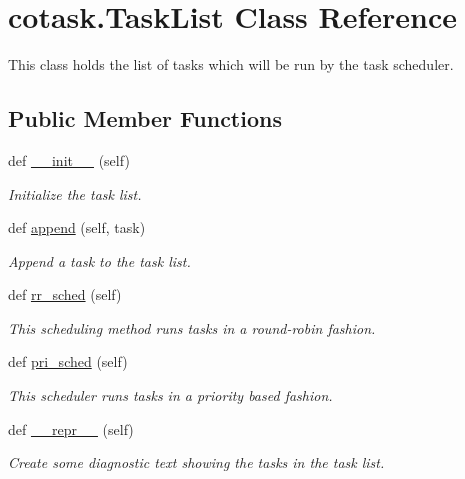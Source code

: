 \hypertarget{classcotask_1_1TaskList}{}\section{cotask.\+Task\+List Class Reference}
\label{classcotask_1_1TaskList}


This class holds the list of tasks which will be run by the task scheduler.  


\subsection*{Public Member Functions}
\begin{DoxyCompactItemize}
\item 
def \hyperlink{classcotask_1_1TaskList_a288413cdeddf60664542a92ce201200a}{\+\_\+\+\_\+init\+\_\+\+\_\+} (self)
\begin{DoxyCompactList}\small\item\em Initialize the task list. \end{DoxyCompactList}\item 
def \hyperlink{classcotask_1_1TaskList_aa690015d692390e17cb777ff367ae159}{append} (self, task)
\begin{DoxyCompactList}\small\item\em Append a task to the task list. \end{DoxyCompactList}\item 
def \hyperlink{classcotask_1_1TaskList_a01614098aedc87b465d5525c6ccb47ce}{rr\+\_\+sched} (self)
\begin{DoxyCompactList}\small\item\em This scheduling method runs tasks in a round-\/robin fashion. \end{DoxyCompactList}\item 
def \hyperlink{classcotask_1_1TaskList_a5f7b264614e8e22c28d4c1509e3f30d8}{pri\+\_\+sched} (self)
\begin{DoxyCompactList}\small\item\em This scheduler runs tasks in a priority based fashion. \end{DoxyCompactList}\item 
def \hyperlink{classcotask_1_1TaskList_aa0632311ba902d3e5d75167dd4215dda}{\+\_\+\+\_\+repr\+\_\+\+\_\+} (self)\hypertarget{classcotask_1_1TaskList_aa0632311ba902d3e5d75167dd4215dda}{}\label{classcotask_1_1TaskList_aa0632311ba902d3e5d75167dd4215dda}

\begin{DoxyCompactList}\small\item\em Create some diagnostic text showing the tasks in the task list. \end{DoxyCompactList}\end{DoxyCompactItemize}
